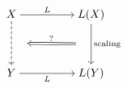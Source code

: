 \[\begin{tikzcd}[cramped]
	X && {L(X)} \\
	\\
	Y && {L(Y)}
	\arrow["L", from=1-1, to=1-3]
	\arrow[""{name=0, anchor=center, inner sep=0}, "{\text{scaling}}", from=1-3, to=3-3]
	\arrow[""{name=1, anchor=center, inner sep=0}, dashed, from=1-1, to=3-1]
	\arrow["L"', from=3-1, to=3-3]
	\arrow["{?}"', shorten <=13pt, shorten >=13pt, Rightarrow, from=0, to=1]
\end{tikzcd}\]